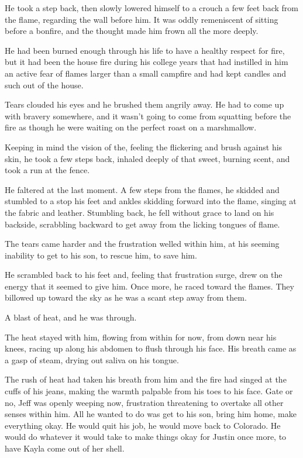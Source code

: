 He took a step back, then slowly lowered himself to a crouch a few feet back from the flame, regarding the wall before him.  It was oddly remeniscent of sitting before a bonfire, and the thought made him frown all the more deeply.

He had been burned enough through his life to have a healthy respect for fire, but it had been the house fire during his college years that had instilled in him an active fear of flames larger than a small campfire and had kept candles and such out of the house.

Tears clouded his eyes and he brushed them angrily away.  He had to come up with bravery somewhere, and it wasn't going to come from squatting before the fire as though he were waiting on the perfect roast on a marshmallow.

Keeping in mind the vision of the, feeling the flickering and brush against his skin, he took a few steps back, inhaled deeply of that sweet, burning scent, and took a run at the fence.

He faltered at the last moment.  A few steps from the flames, he skidded and stumbled to a stop his feet and ankles skidding forward into the flame, singing at the fabric and leather.  Stumbling back, he fell without grace to land on his backside, scrabbling backward to get away from the licking tongues of flame.

The tears came harder and the frustration welled within him, at his seeming inability to get to his son, to rescue him, to save him.

He scrambled back to his feet and, feeling that frustration surge, drew on the energy that it seemed to give him.  Once more, he raced toward the flames.  They billowed up toward the sky as he was a scant step away from them.

A blast of heat, and he was through.

The heat stayed with him, flowing from within for now, from down near his knees, racing up along his abdomen to flush through his face.  His breath came as a gasp of steam, drying out saliva on his tongue.

\secdiv

The rush of heat had taken his breath from him and the fire had singed at the cuffs of his jeans, making the warmth palpable from his toes to his face.  Gate or no, Jeff was openly weeping now, frustration threatening to overtake all other senses within him.  All he wanted to do was get to his son, bring him home, make everything okay.  He would quit his job, he would move back to Colorado.  He would do whatever it would take to make things okay for Justin once more, to have Kayla come out of her shell.

